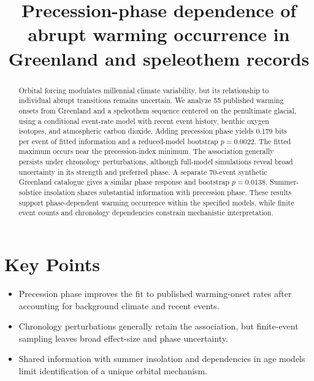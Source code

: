 \documentclass[11pt]{article}
\title{Precession-phase dependence of abrupt warming occurrence in Greenland and speleothem records}
\author{}
\date{}
\begin{document}
\maketitle

\section*{Key Points}
\begin{itemize}
\item Precession phase improves the fit to published warming-onset rates after accounting for background climate and recent events.
\item Chronology perturbations generally retain the association, but finite-event sampling leaves broad effect-size and phase uncertainty.
\item Shared information with summer insolation and dependencies in age models limit identification of a unique orbital mechanism.
\end{itemize}

\begin{abstract}
Orbital forcing modulates millennial climate variability, but its relationship to individual abrupt transitions remains uncertain. We analyze 55 published warming onsets from Greenland and a speleothem sequence centered on the penultimate glacial, using a conditional event-rate model with recent event history, benthic oxygen isotopes, and atmospheric carbon dioxide. Adding precession phase yields 0.179 bits per event of fitted information and a reduced-model bootstrap $p=0.0022$. The fitted maximum occurs near the precession-index minimum. The association generally persists under chronology perturbations, although full-model simulations reveal broad uncertainty in its strength and preferred phase. A separate 70-event synthetic Greenland catalogue gives a similar phase response and bootstrap $p=0.0138$. Summer-solstice insolation shares substantial information with precession phase. These results support phase-dependent warming occurrence within the specified models, while finite event counts and chronology dependencies constrain mechanistic interpretation.
\end{abstract}
\end{document}
